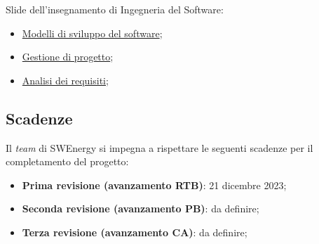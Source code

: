 Slide dell'insegnamento di Ingegneria del Software:
\begin{itemize}
	\item \href{https://www.math.unipd.it/~tullio/IS-1/2023/Dispense/T3.pdf}
	      {Modelli di sviluppo del software};
	\item \href{https://www.math.unipd.it/~tullio/IS-1/2023/Dispense/T4.pdf}
	      {Gestione di progetto};
	\item \href{https://www.math.unipd.it/~tullio/IS-1/2023/Dispense/T5.pdf}
	      {Analisi dei requisiti};
\end{itemize}

\subsection{Scadenze}
Il \textit{team} di SWEnergy si impegna a rispettare le seguenti scadenze per il
completamento del progetto:
\begin{itemize}
	\item \textbf{Prima revisione (avanzamento RTB)}: 21 dicembre 2023;
	\item \textbf{Seconda revisione (avanzamento PB)}: da definire;
	\item \textbf{Terza revisione (avanzamento CA)}: da definire;
\end{itemize}
